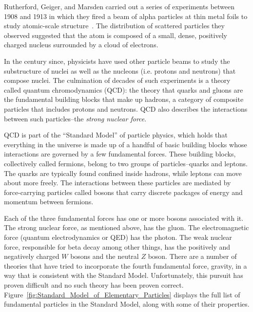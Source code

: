 Rutherford, Geiger, and Marsden carried out a series of experiments between
1908 and 1913 in which they fired a beam of alpha particles
at thin metal foils to study atomic-scale structure~\cite{Rutherford_1911}.
The distribution of scattered particles they observed suggested that the atom
is composed of a small, dense, positively charged nucleus surrounded by a cloud
of electrons.

In the century since, physicists have used other particle beams to study the
substructure of nuclei as well as the nucleons (i.e. protons and neutrons)
that compose nuclei.
The culmination of decades of such experiments is a theory called quantum
chromodynamics (QCD): the theory that quarks and gluons are the fundamental
building blocks that make up hadrons, a category of composite particles that
includes protons and neutrons.
QCD also describes the interactions between such particles--the
\textit{strong nuclear force}.


QCD is part of the ``Standard Model'' of particle physics, which holds that
everything in the universe is made up of a handful of basic building blocks
whose interactions are governed by a few fundamental forces.
These building blocks, collectively called fermions, belong to two groups of
particles--quarks and leptons.
The quarks are typically found confined inside hadrons, while leptons can move
about more freely.
The interactions between these particles are mediated by force-carrying
particles called bosons that carry discrete packages of energy and momentum
between fermions.

Each of the three fundamental forces has one or more bosons associated with it.
The strong nuclear force, as mentioned above, has the gluon.
The electromagnetic force (quantum electrodynamics or QED) has the photon.
The weak nuclear force, responsible for beta decay among other things, has the
positively and negatively charged $W$ bosons and the neutral $Z$ boson.
There are a number of theories that have tried to incorporate the fourth
fundamental force, gravity, in a way that is consistent with the Standard
Model.
Unfortunately, this pursuit has proven difficult and no such theory has been
proven correct.
Figure~\ref{fig:Standard_Model_of_Elementary_Particles} displays the full list
of fundamental particles in the Standard Model, along with some of their
properties.

